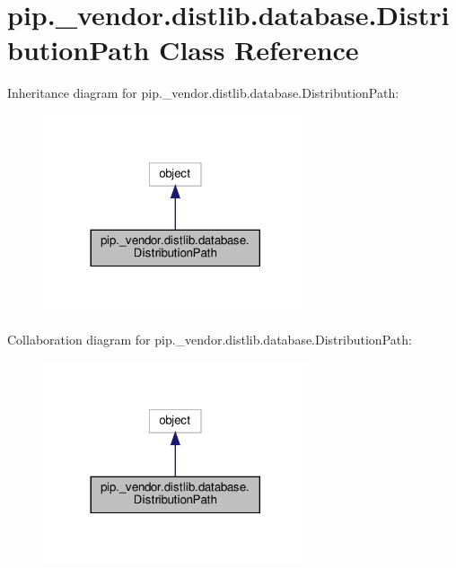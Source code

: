 \hypertarget{classpip_1_1__vendor_1_1distlib_1_1database_1_1DistributionPath}{}\section{pip.\+\_\+vendor.\+distlib.\+database.\+Distribution\+Path Class Reference}
\label{classpip_1_1__vendor_1_1distlib_1_1database_1_1DistributionPath}


Inheritance diagram for pip.\+\_\+vendor.\+distlib.\+database.\+Distribution\+Path\+:
\nopagebreak
\begin{figure}[H]
\begin{center}
\leavevmode
\includegraphics[width=221pt]{classpip_1_1__vendor_1_1distlib_1_1database_1_1DistributionPath__inherit__graph}
\end{center}
\end{figure}


Collaboration diagram for pip.\+\_\+vendor.\+distlib.\+database.\+Distribution\+Path\+:
\nopagebreak
\begin{figure}[H]
\begin{center}
\leavevmode
\includegraphics[width=221pt]{classpip_1_1__vendor_1_1distlib_1_1database_1_1DistributionPath__coll__graph}
\end{center}
\end{figure}
